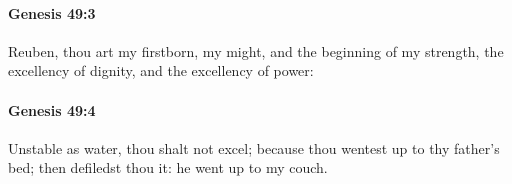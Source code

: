 		\paragraph{Genesis 49:3} %
			\label{GENESIS-49-3}

			Reuben, thou art my firstborn, my might, and the beginning of my strength, the excellency of dignity, and the excellency of power:


		\paragraph{Genesis 49:4} %
			\label{GENESIS-49-4}

			Unstable as water, thou shalt not excel; because thou wentest up to thy father's bed; then defiledst thou it: he went up to my couch.


